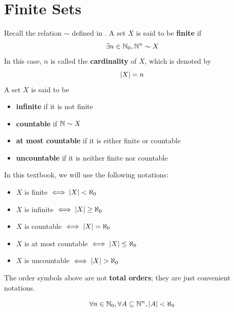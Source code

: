 \section{Finite Sets}

Recall the relation $\sim$ defined in .
A set $X$ is said to be \textbf{finite} if
\[
\exists n \in \N_{0}, \N^{n} \sim X
\]
In this case, $n$ is called the \textbf{cardinality} of $X$, which is denoted by
\[
\abs*{X} = n
\]
A set $X$ is said to be
\begin{itemize}
    \item \textbf{infinite} if it is not finite
    \item \textbf{countable} if $\N \sim X$
    \item \textbf{at most countable} if it is either finite or countable
    \item \textbf{uncountable} if it is neither finite nor countable
\end{itemize}

\bigskip

\begin{remark}
    In this textbook, we will use the following notations:
    \begin{itemize}
        \item $X$ is finite $\iff \abs*{X} < \aleph_{0}$
        \item $X$ is infinite $\iff \abs*{X} \geq \aleph_{0}$
        \item $X$ is countable $\iff \abs*{X} = \aleph_{0}$
        \item $X$ is at most countable $\iff \abs*{X} \leq \aleph_{0}$
        \item $X$ is uncountable $\iff \abs*{X} > \aleph_{0}$
    \end{itemize}
    The order symbols above are not \textbf{total orders}; they are just convenient notations.
\end{remark}

\bigskip

\begin{lemma} \label{an:lem:subset-of-Nn-is-finite}
    \[
    \forall n \in \N_{0}, \forall A \subseteq \N^{n}, \abs*{A} < \aleph_{0}
    \]
\end{lemma}

